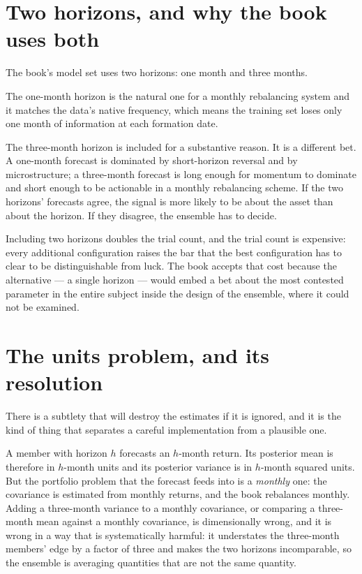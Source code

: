 \section{Two horizons, and why the book uses both}

The book's model set uses two horizons: one month and three months.

The one-month horizon is the natural one for a monthly rebalancing system
and it matches the data's native frequency, which means the training set
loses only one month of information at each formation date.

The three-month horizon is included for a substantive reason. It is a
different bet. A one-month forecast is dominated by short-horizon
reversal and by microstructure; a three-month forecast is long enough for
momentum to dominate and short enough to be actionable in a monthly
rebalancing scheme. If the two horizons' forecasts agree, the signal is
more likely to be about the asset than about the horizon. If they
disagree, the ensemble has to decide.

Including two horizons doubles the trial count, and the trial count is
expensive: every additional configuration raises the bar that the best
configuration has to clear to be distinguishable from luck. The book
accepts that cost because the alternative --- a single horizon --- would
embed a bet about the most contested parameter in the entire subject
inside the design of the ensemble, where it could not be examined.

\section{The units problem, and its resolution}

There is a subtlety that will destroy the estimates if it is ignored, and
it is the kind of thing that separates a careful implementation from a
plausible one.

A member with horizon \(h\) forecasts an \(h\)-month return. Its posterior
mean is therefore in \(h\)-month units and its posterior variance is in
\(h\)-month squared units. But the portfolio problem that the forecast
feeds into is a \emph{monthly} one: the covariance is estimated from
monthly returns, and the book rebalances monthly. Adding a three-month
variance to a monthly covariance, or comparing a three-month mean against
a monthly covariance, is dimensionally wrong, and it is wrong in a way that
is systematically harmful: it understates the three-month members' edge
by a factor of three and makes the two horizons incomparable, so the
ensemble is averaging quantities that are not the same quantity.


